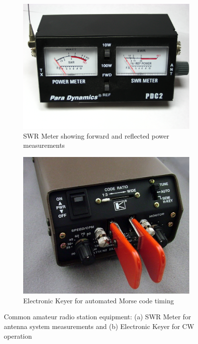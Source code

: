 \begin{figure}[h!]
    \centering
    \begin{subfigure}[b]{0.45\textwidth}
        \centering
        \includegraphics[width=\textwidth]{images/swr_meter.jpg}
        \caption{SWR Meter showing forward and reflected power measurements}
        \label{fig:swr-meter}
    \end{subfigure}
    \hfill
    \begin{subfigure}[b]{0.45\textwidth}
        \centering
        \includegraphics[width=\textwidth]{images/keyer.jpg}
        \caption{Electronic Keyer for automated Morse code timing}
        \label{fig:electronic-keyer}
    \end{subfigure}
    \caption{Common amateur radio station equipment: (a) SWR Meter for antenna system measurements and (b) Electronic Keyer for CW operation}
    \label{fig:station-equipment}
\end{figure}


